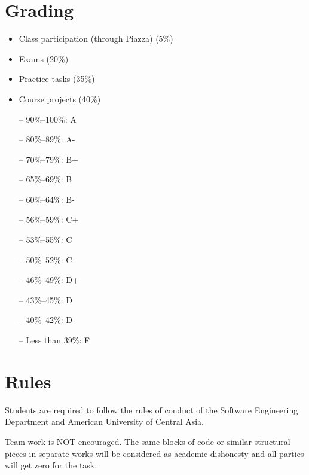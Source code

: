 \documentclass[12pt,a4paper,oneside]{article}
\begin{document}
    \section{Grading}

        \begin{itemize}
        	\item Class participation (through Piazza) (5\%)
            \item Exams (20\%)
            \item Practice tasks (35\%)
            \item Course projects (40\%)
        \end{itemize}

        \begin{itemize} \itemsep-10pt \parskip0pt 
            \item[--] 90\%--100\%: A\\
            \item[--] 80\%--89\%: A-\\
            \item[--] 70\%--79\%: B+\\
            \item[--] 65\%--69\%: B\\
            \item[--] 60\%--64\%: B-\\
            \item[--] 56\%--59\%: C+\\
            \item[--] 53\%--55\%: C\\
            \item[--] 50\%--52\%: C-\\
            \item[--] 46\%--49\%: D+\\
            \item[--] 43\%--45\%: D\\
            \item[--] 40\%--42\%: D-\\
            \item[--] Less than 39\%: F
        \end{itemize}

    \section{Rules}

        Students are required to follow the rules of conduct of the Software
        Engineering Department and American University of Central Asia.

        Team work is NOT encouraged. The same blocks of code or similar
        structural pieces in separate works will be considered as academic
        dishonesty and all parties will get zero for the task.
\end{document}

